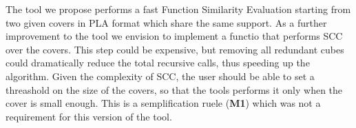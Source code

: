 \documentclass{acm_proc_article-sp}
\begin{document}
The tool we propose performs a fast Function Similarity Evaluation starting
from two given covers in PLA format which share the same support.
As a further improvement to the tool we envision to implement a functio
that performs SCC over the covers. This step could be expensive, but
removing all redundant cubes could dramatically reduce the total
recursive calls, thus speeding up the algorithm. Given the complexity
of SCC, the user should be able to set a threashold on the size of the
covers, so that the tools performs it only when the cover is small
enough. This is a semplification ruele ({\bf M1}) which was not a
requirement for this version of the tool.

%
%
\end{document}

